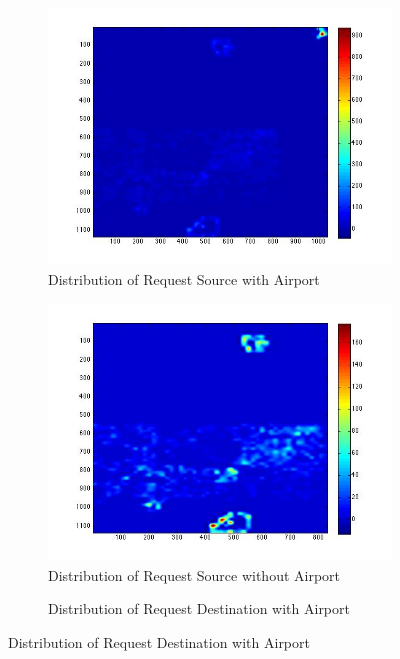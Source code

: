 \documentclass[titlepage]{article}
\begin{document}
\begin{figure}[H]
      \centering
      \begin{subfigure}{0.48\textwidth}
	\caption{Distribution of Request Source with Airport}
      \centering
      \includegraphics[width=1.1\textwidth]{src_with_airport.jpg}
      \end{subfigure}\quad
      \begin{subfigure}{0.48\textwidth}
	\caption{Distribution of Request Source without Airport}
      \centering
      \includegraphics[width=1.1\textwidth]{src_without_airport.jpg}
      \end{subfigure}
      \begin{subfigure}{0.48\textwidth}
	\caption{Distribution of Request Destination with Airport}

\end{subfigure}
\end{figure}
\end{document}
